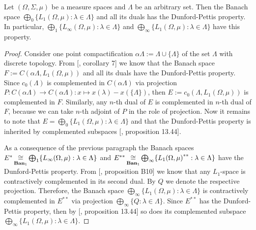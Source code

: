 \begin{proposition}\label{C0SumOfL1SpHaveDPP} Let $(\Omega, \Sigma, \mu)$ be a
measure spaces and $\Lambda$ be an arbitrary set. Then the Banach space
$\bigoplus_0 \{L_1(\Omega,\mu):\lambda\in\Lambda \}$ and all its duals has the
Dunford-Pettis property. In particular, $\bigoplus_1
\{L_\infty(\Omega,\mu):\lambda\in\Lambda \}$ and $\bigoplus_\infty
\{L_1(\Omega,\mu):\lambda\in\Lambda \}$ have this property.
\end{proposition}
\begin{proof} Consider one point compactification $\alpha\Lambda:=\Lambda\cup
\{\Lambda \}$ of the set $\Lambda$ with discrete topology. From
[\cite{BourgOnTheDPP}, corollary 7] we know 
that the Banach space $F:=C(\alpha\Lambda, L_1(\Omega, \mu))$ and all 
its duals have the Dunford-Pettis property. Since $c_0(\Lambda)$ is complemented 
in $C(\alpha\Lambda)$ via projection 
$P:C(\alpha\Lambda)\to C(\alpha\Lambda):x\mapsto x(\lambda)-x( \{\Lambda \})$, 
then $E:=c_0(\Lambda, L_1(\Omega,\mu))$ is complemented 
in $F$. Similarly, any $n$-th dual of $E$ is complemented in $n$-th dual of $F$, 
because we can take $n$-th adjoint of $P$ in the role of projection. 
Now it remains to note that $E=\bigoplus_0 \{L_1(\Omega,\mu):\lambda\in\Lambda \}$ 
and that the Dunford-Pettis property is inherited by complemented subspaces
[\cite{FabHabBanSpTh}, proposition 13.44]. 

As a consequence of the previous paragraph the Banach spaces
$E^*
\mathop{\mathbin{\cong}}\limits_{\mathbf{Ban}_1}
\bigoplus_1 \{
    L_\infty(\Omega,\mu):\lambda\in\Lambda
 \}$ 
and $E^{**}
\mathop{\mathbin{\cong}}\limits_{\mathbf{Ban}_1}
    \bigoplus_\infty \{{L_1(\Omega,\mu)}^{**}:\lambda\in\Lambda
 \}$ 
have the Dunford-Pettis property.
From [\cite{DefFloTensNorOpId}, proposition B10] we know that any $L_1$-space is
contractively complemented in its second dual. By $Q$ we denote the respective
projection. Therefore, the Banach space $\bigoplus_\infty
\{L_1(\Omega,\mu):\lambda\in\Lambda \}$ is contractively complemented in
$E^{**}$ via projection $\bigoplus_\infty  \{Q:\lambda\in\Lambda \}$. Since
$E^{**}$ has the Dunford-Pettis property, then by [\cite{FabHabBanSpTh},
proposition 13.44] so does its complemented 
subspace $\bigoplus_\infty \{L_1(\Omega,\mu):\lambda\in\Lambda \}$.
\end{proof}

